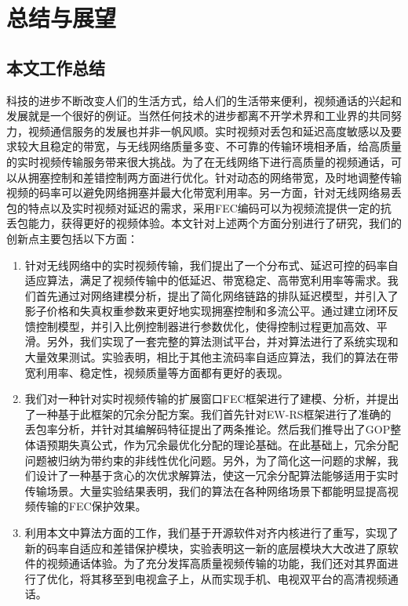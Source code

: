\chapter{总结与展望}
\label{chap:conclusion}

\section{本文工作总结}
科技的进步不断改变人们的生活方式，给人们的生活带来便利，视频通话的兴起和发展就是一个很好的例证。当然任何技术的进步都离不开学术界和工业界的共同努力，视频通信服务的发展也并非一帆风顺。实时视频对丢包和延迟高度敏感以及要求较大且稳定的带宽，与无线网络质量多变、不可靠的传输环境相矛盾，给高质量的实时视频传输服务带来很大挑战。为了在无线网络下进行高质量的视频通话，可以从拥塞控制和差错控制两方面进行优化。针对动态的网络带宽，及时地调整传输视频的码率可以避免网络拥塞并最大化带宽利用率。另一方面，针对无线网络易丢包的特点以及实时视频对延迟的需求，采用FEC编码可以为视频流提供一定的抗丢包能力，获得更好的视频体验。本文针对上述两个方面分别进行了研究，我们的创新点主要包括以下方面：
\begin{enumerate}
    \item 针对无线网络中的实时视频传输，我们提出了一个分布式、延迟可控的码率自适应算法，满足了视频传输中的低延迟、带宽稳定、高带宽利用率等需求。我们首先通过对网络建模分析，提出了简化网络链路的排队延迟模型，并引入了影子价格和失真权重参数来更好地实现拥塞控制和多流公平。通过建立闭环反馈控制模型，并引入比例控制器进行参数优化，使得控制过程更加高效、平滑。另外，我们实现了一套完整的算法测试平台，并对算法进行了系统实现和大量效果测试。实验表明，相比于其他主流码率自适应算法，我们的算法在带宽利用率、稳定性，视频质量等方面都有更好的表现。
    \item 我们对一种针对实时视频传输的扩展窗口FEC框架进行了建模、分析，并提出了一种基于此框架的冗余分配方案。我们首先针对EW-RS框架进行了准确的丢包率分析，并针对其编解码特征提出了两条推论。然后我们推导出了GOP整体语预期失真公式，作为冗余最优化分配的理论基础。在此基础上，冗余分配问题被归纳为带约束的非线性优化问题。另外，为了简化这一问题的求解，我们设计了一种基于贪心的次优求解算法，使这一冗余分配算法能够适用于实时传输场景。大量实验结果表明，我们的算法在各种网络场景下都能明显提高视频传输的FEC保护效果。
    \item 利用本文中算法方面的工作，我们基于开源软件对齐内核进行了重写，实现了新的码率自适应和差错保护模块，实验表明这一新的底层模块大大改进了原软件的视频通话体验。为了充分发挥高质量视频传输的功能，我们还对其界面进行了优化，将其移至到电视盒子上，从而实现手机、电视双平台的高清视频通话。
\end{enumerate}


